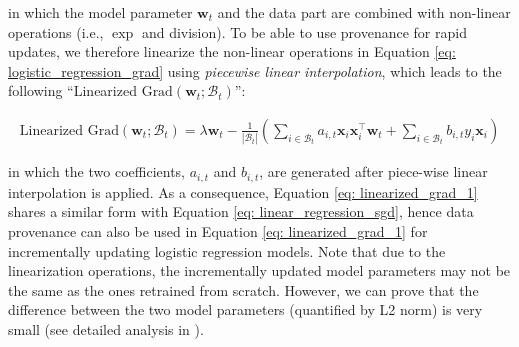 \documentclass[11pt]{article}
\newcommand{\w}{\textbf{w}}
\newcommand{\x}{\textbf{x}}
\newcommand{\y}{y}
\newcommand{\miniB}{\mathscr{B}}
\begin{document}
\noindent
in which the model parameter $\w_t$ and the data part are combined with non-linear operations 
(i.e., $\exp$ and division).
To be able to use provenance for rapid updates, we therefore linearize the non-linear operations in Equation \eqref{eq: logistic_regression_grad} using {\em piecewise linear interpolation}, which leads to the following ``Linearized $\text{Grad}(\w_t; \miniB_t)$'':
\begin{small}
\begin{align}\label{eq: linearized_grad_1}
    \text{Linearized $\text{Grad}(\w_t; \miniB_t)$} = \lambda\w_t -  \frac{1}{|\miniB_t|}(\sum\nolimits_{i\in \miniB_{t}}a_{i, t}\x_i\x_i^\top\w_{t} + \sum\nolimits_{i\in \miniB_t} b_{i, t}\y_i\x_i)
\end{align}
\end{small}

\noindent
in which the two coefficients, $a_{i,t}$ and $b_{i,t}$, are generated after piece-wise linear interpolation is applied.
As a consequence, Equation \eqref{eq: linearized_grad_1} shares a similar form with Equation \eqref{eq: linear_regression_sgd}, hence
data provenance can also be used in Equation \eqref{eq: linearized_grad_1} for incrementally updating logistic regression models. Note that due to the linearization operations, the incrementally updated model parameters may not be the same as the ones retrained from scratch. However, we can prove that the difference between the two model parameters (quantified by L2 norm) is very small (see detailed analysis in \cite{wu2020priu}).
\end{document}
